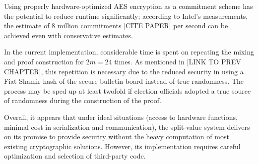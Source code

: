 Using properly hardware-optimized AES encryption as a commitment scheme has the potential to reduce runtime significantly; according to Intel's measurements, the estimate of 8 million commitments [CITE PAPER] per second can be achieved even with conservative estimates.

In the current implementation, considerable time is spent on repeating the mixing and proof construction for $2m = 24$ times. As mentioned in [LINK TO PREV CHAPTER], this repetition is necessary due to the reduced security in using a Fiat-Shamir hash of the secure bulletin board instead of true randomness. The process may be sped up at least twofold if election officials adopted a true source of randomness during the construction of the proof.

Overall, it appears that under ideal situations (access to hardware functions, minimal cost in serialization and communication), the split-value system delivers on its promise to provide security without the heavy computation of most existing cryptographic solutions. However, its implementation requires careful optimization and selection of third-party code.
